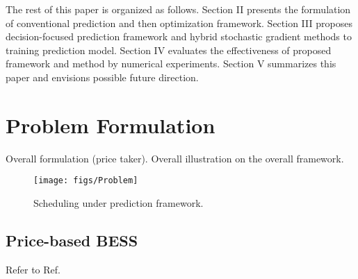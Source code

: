 \documentclass[journal]{IEEEtran}
\newcommand{\slw}{\color{blue}}
\begin{document}
The rest of this paper is organized as follows. Section II presents the formulation of conventional prediction and then optimization framework. Section III proposes decision-focused prediction framework and hybrid stochastic gradient methods to training prediction model. Section IV evaluates the effectiveness of proposed framework and method by numerical experiments. Section V summarizes this paper and envisions possible future direction.

\section{Problem Formulation}
Overall formulation (price taker). {\slw Overall illustration on the overall framework.}

\begin{figure}[ht]
  \centering
  \texttt{[image: figs/Problem]}
  \caption{Scheduling under prediction framework.}
  \label{Problemform}
\end{figure}

\subsection{Price-based BESS}
{\slw Refer to Ref. \cite{Chitsaz2018}}
\end{document}
